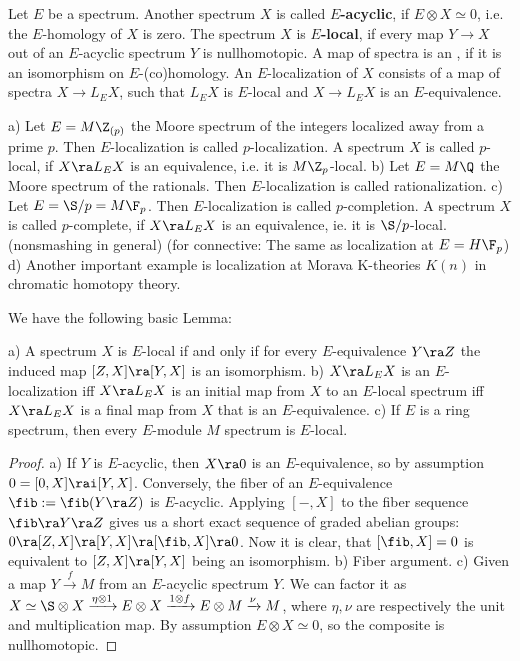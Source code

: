 \begin{defn}
Let $E$ be a spectrum.
Another spectrum $X$ is called \textbf{$E$-acyclic}, if $E\otimes X\simeq 0$, i.e. the $E$-homology of $X$ is zero. The spectrum $X$ is \textbf{$E$-local}, if every map $Y\rightarrow X $ out of an $E$-acyclic spectrum $Y$ is nullhomotopic. A map of spectra is an , if it is an isomorphism on $E$-(co)homology. An $E$-localization of $X$ consists of a map of spectra $X\rightarrow L_E X$, such that $L_E X$ is $E$-local and $X\rightarrow L_E X$ is an $E$-equivalence. 
\end{defn}
\begin{exa}
a) Let $E=M\Z_{(p)}$ the Moore spectrum of the integers localized away from a prime $p$. Then $E$-localization is called $p$-localization.
A spectrum $X$ is called $p$-local, if $X\ra L_EX$ is an equivalence, i.e. it is $M\Z_{p}$-local.\newline
b) Let $E=M\Q$ the Moore spectrum of the rationals. Then $E$-localization is called rationalization. \newline
c) Let $E=\S/p=M\F_p$. Then $E$-localization is called $p$-completion. A spectrum $X$ is called $p$-complete, if $X\ra L_EX$ is an equivalence, ie. it is $\S/p$-local.
(nonsmashing in general) (for connective: The same as localization at  $E=H\F_p$)
\newline
d) Another important example is localization at Morava K-theories $K(n)$ in chromatic homotopy theory.
\end{exa}
We have the following basic Lemma:
\begin{lem}
a) A spectrum $X$ is $E$-local if and only if for every $E$-equivalence $Y \ra Z$ the induced map $[Z,X]\ra [Y,X]$ is an isomorphism.
\newline
b) $X\ra L_E X$ is an $E$-localization iff $X\ra L_EX$ is an initial map from $X$ to an $E$-local spectrum iff $X\ra L_EX$ is a final map from $X$ that is an $E$-equivalence.\newline
c) If $E$ is a ring spectrum, then every $E$-module $M$ spectrum is $E$-local.
\end{lem} 
\begin{proof}
a) If $Y$ is $E$-acyclic, then $X\ra 0$ is an $E$-equivalence, so by assumption $0=[0,X]\rai [Y,X]$.
\newline
Conversely, the fiber of an $E$-equivalence $\fib:=\fib(Y\ra Z)$ is $E$-acyclic. Applying $[-,X]$ to the fiber sequence $\fib\ra Y\ra Z $
gives us a short exact sequence of graded abelian groups: $0\ra [Z,X]\ra [Y,X] \ra [\fib, X]\ra 0$. Now it is clear, that $[\fib,X]=0$ is equivalent to $[Z,X]\ra [Y,X]$ being an isomorphism.
\newline
b) Fiber argument.
\newline
c) Given a map $Y\xrightarrow{f} M$ from an $E$-acyclic spectrum $Y$. We can factor it as $X\simeq\S\otimes X\xrightarrow{\eta\otimes 1}E\otimes X\xrightarrow{1\otimes f}E\otimes M\xrightarrow{\nu}M$, where $\eta, \nu$ are respectively the unit and multiplication map. 
By assumption $E\otimes X\simeq0$, so the composite is nullhomotopic.
\end{proof}

